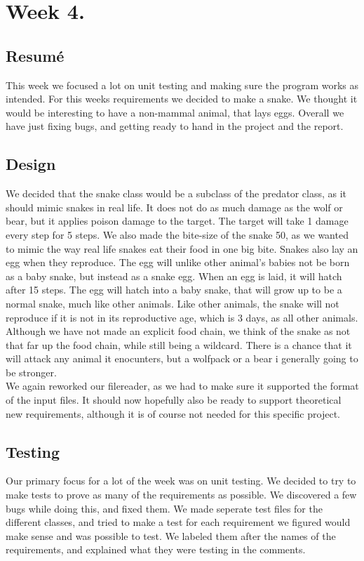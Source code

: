 \documentclass[11pt]{article}
\begin{document}
    \section*{Week 4.}
    \subsection*{Resumé}
    This week we focused a lot on unit testing and making sure the program works as intended. For this weeks requirements we decided to make a snake. We thought it would be 
    interesting to have a non-mammal animal, that lays eggs. Overall we have just fixing bugs, and getting ready to hand in the project and the report. 
    \subsection*{Design}
    We decided that the snake class would be a subclass of the predator class, as it should mimic snakes in real life. It does not do as much damage as the wolf or bear, 
    but it applies poison damage to the target. The target will take 1 damage every step for 5 steps. We also made the bite-size of the snake 50, as we wanted to mimic the way real 
    life snakes eat their food in one big bite. 
    Snakes also lay an egg when they reproduce. The egg will unlike other animal's babies not be born as a baby snake, but instead as a snake egg. When an egg is laid, it will 
    hatch after 15 steps. The egg will hatch into a baby snake, that will grow up to be a normal snake, much like other animals. Like other animals, the snake will not reproduce 
    if it is not in its reproductive age, which is 3 days, as all other animals. 
    Although we have not made an explicit food chain, we think of the snake as not that far up the food chain, while still being a wildcard. There is a chance that it will attack 
    any animal it enocunters, but a wolfpack or a bear i generally going to be stronger. 
    \\
    We again reworked our filereader, as we had to make sure it supported the format of the input files. 
    It should now hopefully also be ready to support theoretical new requirements, although it is of course not needed for this specific project. 
    \subsection*{Testing}
    Our primary focus for a lot of the week was on unit testing. We decided to try to make tests to prove as many of the requirements as possible. 
    We discovered a few bugs while doing this, and fixed them. We made seperate test files for the different classes, and tried to make a test for each requirement we 
    figured would make sense and was possible to test. We labeled them after the names of the requirements, and explained what they were testing in the comments. 
\end{document}
